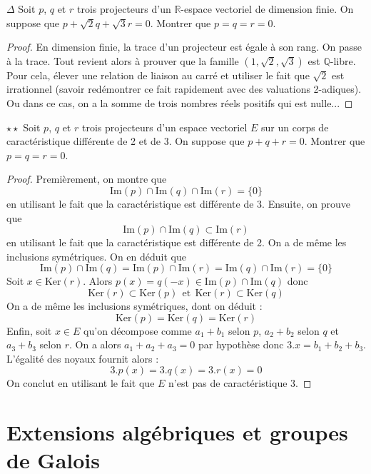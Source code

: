 \documentclass[french,a4paper]{article}
\newcommand{\Q}{\mathbb{Q}}
\newcommand{\R}{\mathbb{R}}
\renewcommand{\ker}{\text{Ker}}
\newcommand{\im}{\text{Im}}
\theoremstyle{plain}
\theoremstyle{definition}
\theoremstyle{remark}
\begin{document}
\begin{ex}[Moulin.EV.58]{$\Delta$}
	Soit $p$, $q$ et $r$ trois projecteurs d'un $\R$-espace vectoriel de dimension finie. On suppose que $p+\sqrt{2}q+\sqrt{3}r=0$. Montrer que $p=q=r=0$.
\end{ex}
\begin{proof}
	En dimension finie, la trace d'un projecteur est égale à son rang. On passe à la trace. Tout revient alors à prouver que la famille $(1,\sqrt{2},\sqrt{3})$ est $\Q$-libre. Pour cela, élever une relation de liaison au carré et utiliser le fait que $\sqrt{2}$ est irrationnel (savoir redémontrer ce fait rapidement avec des valuations 2-adiques). Ou dans ce cas, on a la somme de trois nombres réels positifs qui est nulle...
\end{proof}

\begin{ex}[Moulin.EV.59]{$\star\star$}
	Soit $p$, $q$ et $r$ trois projecteurs d'un espace vectoriel $E$ sur un corps de caractéristique différente de 2 et de 3. On suppose que $p+q+r=0$. Montrer que $p=q=r=0$.
\end{ex}
\begin{proof}
	Premièrement, on montre que $$\im(p)\cap\im(q)\cap\im(r)=\{0\}$$ en utilisant le fait que la caractéristique est différente de 3. Ensuite, on prouve que $$\im(p)\cap\im(q)\subset\im(r)$$ en utilisant le fait que la caractéristique est différente de 2. On a de même les inclusions symétriques. On en déduit que $$\im(p)\cap\im(q)=\im(p)\cap\im(r)=\im(q)\cap\im(r)=\{0\}$$ Soit $x\in\ker(r)$. Alors $p(x)=q(-x)\in\im(p)\cap\im(q)$ donc $$\ker(r)\subset\ker(p) \ \ \text{et} \ \ \ker(r)\subset\ker(q)$$ On a de même les inclusions symétriques, dont on déduit : $$\ker(p)=\ker(q)=\ker(r)$$ Enfin, soit $x\in E$ qu'on décompose comme $a_1+b_1$ selon $p$, $a_2+b_2$ selon $q$ et $a_3+b_3$ selon $r$. On a alors $a_1+a_2+a_3=0$ par hypothèse donc $3.x=b_1+b_2+b_3$. L'égalité des noyaux fournit alors : $$3.p(x)=3.q(x)=3.r(x)=0$$ On conclut en utilisant le fait que $E$ n'est pas de caractéristique 3.
\end{proof}

\section{Extensions algébriques et groupes de Galois}
\end{document}
